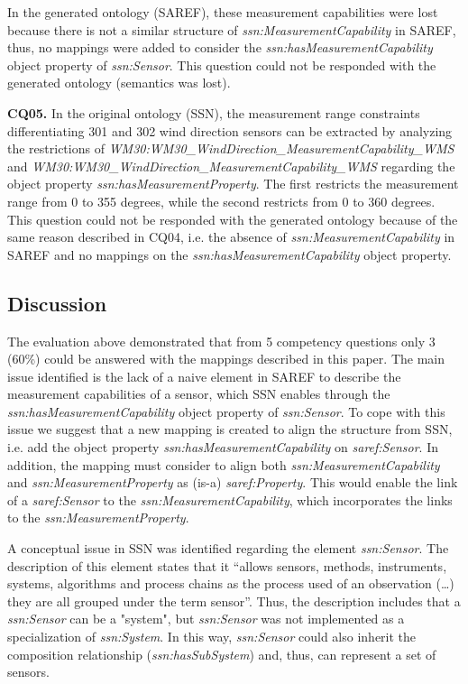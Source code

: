 \documentclass{sig-alternate-05-2015}
\begin{document}
In the generated ontology (SAREF), these measurement capabilities were lost because there is not a similar structure of \textit{ssn:\-MeasurementCapability} in SAREF, thus, no mappings were added to consider the  \textit{ssn:\-hasMeasurementCapability} object property of \textit{ssn:\-Sensor}. This question could not be responded with the generated ontology (semantics was lost).  

\noindent
\textbf{CQ05.} In the original ontology (SSN), the measurement range constraints differentiating 301 and 302 wind direction sensors can be extracted by analyzing the restrictions of \textit{WM30:\-WM30\-\_Wind\-Direction\-\_Measurement\-Capability\-\_WMS} and \textit{WM30:\-WM30\-\_Wind\-Direction\-\_Measurement\-Capability\-\_WMS} regarding the object property \textit{ssn:\-has\-Measurement\-Property}. The first restricts the measurement range from 0 to 355 degrees, while the second restricts from 0 to 360 degrees. This question could not be responded with the generated ontology because of the same reason described in CQ04, i.e. the absence of \textit{ssn:\-MeasurementCapability} in SAREF and no mappings on the \textit{ssn:\-hasMeasurementCapability} object property.


\subsection{Discussion}

The evaluation above demonstrated that from 5 competency questions only 3 (60\%) could be answered with the mappings described in this paper. The main issue identified is the lack of a naive element in SAREF to describe the measurement capabilities of a sensor, which SSN enables through the \textit{ssn:\-hasMeasurementCapability} object property of \textit{ssn:\-Sensor}. To cope with this issue we suggest that a new mapping is created to align the structure from SSN, i.e. add the object property \textit{ssn:\-has\-Measurement\-Capability} on \textit{saref:\-Sensor}. In addition, the mapping must consider to align both \textit{ssn:\-Measurement\-Capability} and \textit{ssn:\-Measurement\-Property} as (is-a) \textit{saref:\-Property}. This would enable the link of a \textit{saref:\-Sensor} to the \textit{ssn:\-Measurement\-Capability}, which incorporates the links to the \textit{ssn:\-Measurement\-Property}. 

A conceptual issue in SSN was identified regarding the element \textit{ssn:\-Sensor}. The description of this element states that it “allows sensors, methods, instruments, systems, algorithms and process chains as the process used of an observation (…) they are all grouped under the term sensor”. Thus, the description includes that a \textit{ssn:\-Sensor} can be a "system", but \textit{ssn:\-Sensor} was not implemented as a specialization of \textit{ssn:\-System}. In this way, \textit{ssn:\-Sensor} could also inherit the composition relationship (\textit{ssn:\-hasSubSystem}) and, thus, can represent a set of sensors. 
\end{document}
